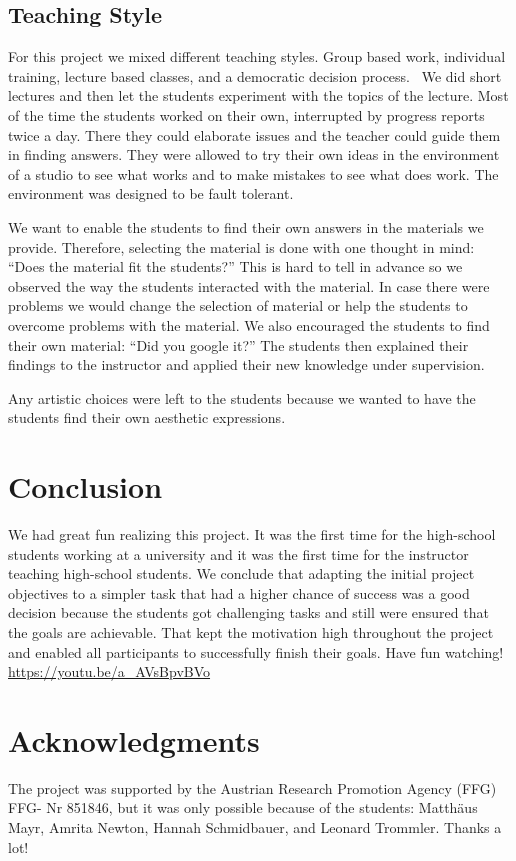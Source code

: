\documentclass[onecolumn,nocopyrightspace,preprint]{sigplanconf}
\begin{document}
\subsection{Teaching Style}

For this project we mixed different teaching styles. Group based work,
individual training, lecture based classes, and a democratic decision
process.~\cite{book:Hubwieser2007} We did short lectures and then let the
students experiment with the topics of the lecture. Most of the time the
students worked on their own, interrupted by progress reports twice a day.
There they could elaborate issues and the teacher could guide them in finding
answers. They were allowed to try their own ideas in the environment of a
studio to see what works and to make mistakes to see what does work. The
environment was designed to be fault tolerant.

We want to enable the students to find their own answers in the materials we
provide. Therefore, selecting the material is done with one thought in mind:
``Does the material fit the students?'' This is hard to tell in advance so we
observed the way the students interacted with the material. In case there were
problems we would change the selection of material or help the students to
overcome problems with the material. We also encouraged the students to find
their own material: ``Did you google it?'' The students then explained their
findings to the instructor and applied their new knowledge under supervision.

Any artistic choices were left to the students because we wanted to have the
students find their own aesthetic expressions.~\cite{book:Peez2008}

\section{Conclusion}

We had great fun realizing this project. It was the first time for the 
high-school students working at a university and it was the first time for the
instructor teaching high-school students. We conclude that adapting the
initial project objectives to a simpler task that had a higher chance of
success was a good decision because the students got challenging tasks and
still were ensured that the goals are achievable. That kept the motivation
high throughout the project and enabled all participants to successfully
finish their goals. Have fun watching! \url{https://youtu.be/a_AVsBpvBVo}

\section{Acknowledgments}

The project was supported by the Austrian Research Promotion Agency (FFG) FFG-
Nr 851846, but it was only possible because of the students: Matthäus Mayr,
Amrita Newton, Hannah Schmidbauer, and Leonard Trommler. Thanks a lot!


 
\end{document}
